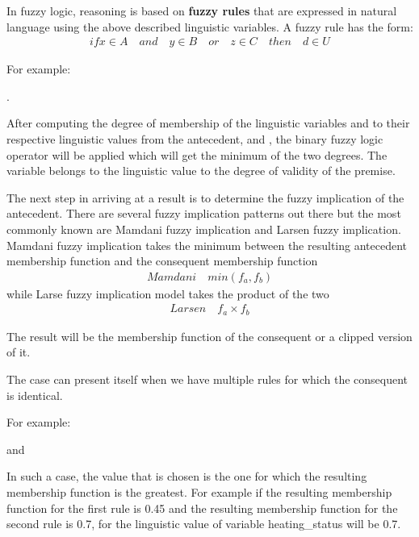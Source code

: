 \documentclass[conference]{IEEEtran}
\begin{document}
In fuzzy logic, reasoning is based on \textbf{fuzzy rules} that are expressed in natural language using the
above described linguistic variables. A fuzzy rule has the form:
\begin{align}
if x \in A \quad and \quad y \in B \quad or \quad z \in C \quad then \quad d \in U
\end{align}

For example: \par
{}.

After computing the degree of membership of the linguistic variables  and  to their
respective linguistic values from the antecedent,  and , the binary fuzzy logic operator 
will be applied which will get the minimum of the two degrees.
The variable  belongs to the linguistic value  to the degree of validity of the
premise.

The next step in arriving at a result is to determine the fuzzy implication of the antecedent. There are
several fuzzy implication patterns out there but the most commonly known are Mamdani fuzzy implication and
Larsen fuzzy implication.
Mamdani fuzzy implication takes the minimum between the resulting antecedent membership function and the
consequent membership function
\begin{align}
Mamdani \quad min(f_{a}, f_{b})
\end{align}
while Larse fuzzy implication model takes the product of the two
\begin{align}
Larsen \quad f_{a} \times f_{b}
\end{align}

The result will be the membership function of the consequent or a clipped version of it. \par

The case can present itself when we have multiple rules for which the consequent is identical. \par
For example: \par
{}\par
and \par
{} \par
In such a case, the value that is chosen is the one for which the resulting membership function is the
greatest. For example if the resulting membership function for the first rule is 0.45 and the resulting
membership function for the second rule is 0.7, for the linguistic value  of variable
heating\_status will be 0.7.
\end{document}
